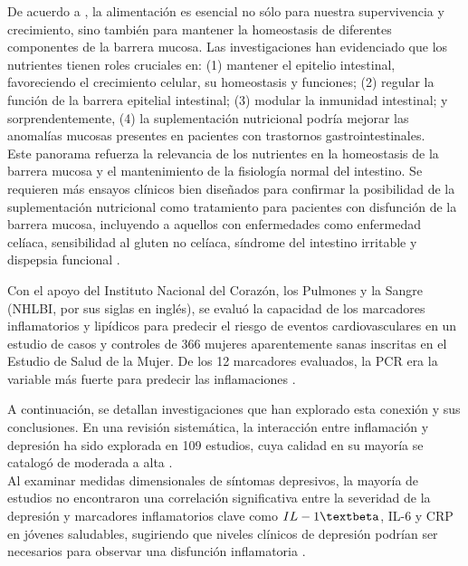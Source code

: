 \documentclass[man]{apa7}
\begin{document}
	De acuerdo a \parencite{Farre2020}, la alimentación es esencial no sólo
	para nuestra supervivencia y crecimiento, sino también para mantener la
	homeostasis de diferentes componentes de la barrera mucosa. Las
	investigaciones han evidenciado que los nutrientes tienen roles
	cruciales en: (1) mantener el epitelio intestinal, favoreciendo el
	crecimiento celular, su homeostasis y funciones; (2) regular la función
	de la barrera epitelial intestinal; (3) modular la inmunidad intestinal;
	y sorprendentemente, (4) la suplementación nutricional podría mejorar
	las anomalías mucosas presentes en pacientes con trastornos
	gastrointestinales.\\

	Este panorama refuerza la relevancia de los nutrientes en la homeostasis
	de la barrera mucosa y el mantenimiento de la fisiología normal del
	intestino. Se requieren más ensayos clínicos bien diseñados para
	confirmar la posibilidad de la suplementación nutricional como
	tratamiento para pacientes con disfunción de la barrera mucosa,
	incluyendo a aquellos con enfermedades como enfermedad celíaca,
	sensibilidad al gluten no celíaca, síndrome del intestino irritable y
	dispepsia funcional \parencite{Farre2020}.

	Con el apoyo del Instituto Nacional del Corazón, los Pulmones y la
	Sangre (NHLBI, por sus siglas en inglés), se evaluó la capacidad de los
	marcadores inflamatorios y lipídicos para predecir el riesgo de eventos
	cardiovasculares en un estudio de casos y controles de 366 mujeres
	aparentemente sanas inscritas en el Estudio de Salud de la Mujer. De los
	12 marcadores evaluados, la PCR era la variable más fuerte para predecir
	las inflamaciones \parencite{ridkerHighsensitivityCreactiveProtein2004}.

	A continuación, se detallan investigaciones que han explorado esta
	conexión y sus conclusiones. En una revisión sistemática, la interacción
	entre inflamación y depresión ha sido explorada en 109 estudios, cuya
	calidad en su mayoría se catalogó de moderada a alta \parencite{Toenders2022}.\\

	Al examinar medidas dimensionales de síntomas depresivos, la mayoría de
	estudios no encontraron una correlación significativa entre la severidad
	de la depresión y marcadores inflamatorios clave como $IL-1\textbeta$, IL-6 y CRP
	en jóvenes saludables, sugiriendo que niveles clínicos de depresión
	podrían ser necesarios para observar una disfunción inflamatoria
	\parencite{Toenders2022}.\\
\end{document}
